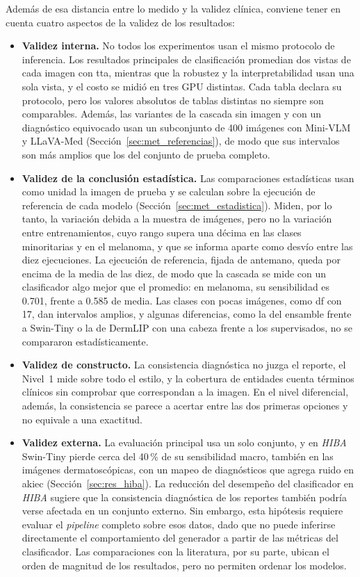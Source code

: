 Además de esa distancia entre lo medido y la validez clínica, conviene tener en cuenta cuatro aspectos de la validez de los resultados:
\begin{itemize}
    \item \textbf{Validez interna.} No todos los experimentos usan el mismo protocolo de inferencia. Los resultados
    principales de clasificación promedian dos vistas de cada imagen con \gls{tta}, mientras que la robustez y la
    interpretabilidad usan una sola vista, y el costo se midió en tres GPU distintas. Cada tabla declara su protocolo,
    pero los valores absolutos de tablas distintas no siempre son comparables. Además, las variantes de la cascada sin
    imagen y con un diagnóstico equivocado usan un subconjunto de 400 imágenes con Mini-VLM y LLaVA-Med
    (Sección~\ref{sec:met_referencias}), de modo que sus intervalos son más amplios que los del conjunto de prueba completo.
    \item \textbf{Validez de la conclusión estadística.} Las comparaciones estadísticas usan como unidad la imagen de prueba y se
    calculan sobre la ejecución de referencia de cada modelo (Sección~\ref{sec:met_estadistica}). Miden, por lo
    tanto, la variación debida a la muestra de imágenes, pero no la variación entre entrenamientos, cuyo rango supera una décima en las clases minoritarias y en el melanoma, y que se informa aparte como desvío entre las diez ejecuciones. La ejecución de referencia, fijada de antemano, queda por encima de la media de las diez, de modo que la cascada se mide con un clasificador algo mejor que el promedio: en melanoma, su sensibilidad es 0.701, frente a 0.585 de media. Las
    clases con pocas imágenes, como \gls{df} con 17, dan intervalos amplios, y algunas diferencias, como la del
    ensamble frente a Swin-Tiny o la de DermLIP con una cabeza frente a los supervisados, no se compararon estadísticamente.
    \item \textbf{Validez de constructo.} La consistencia diagnóstica no juzga el reporte, el Nivel~1 mide sobre todo
    el estilo, y la cobertura de entidades cuenta términos clínicos sin comprobar que correspondan a la imagen. En el
    nivel diferencial, además, la consistencia se parece a acertar entre las dos primeras opciones y no equivale a una
    exactitud.
    \item \textbf{Validez externa.} La evaluación principal usa un solo conjunto, y en \emph{HIBA} Swin-Tiny pierde
    cerca del 40\,\% de su sensibilidad macro, también en las imágenes dermatoscópicas, con un mapeo de diagnósticos
    que agrega ruido en \gls{akiec} (Sección~\ref{sec:res_hiba}). La reducción del desempeño del clasificador en \emph{HIBA} sugiere que la consistencia diagnóstica de los reportes también podría verse afectada en un conjunto externo. Sin embargo, esta hipótesis requiere evaluar el \emph{pipeline} completo sobre esos datos, dado que no puede inferirse directamente el comportamiento del generador a partir de las métricas del clasificador. Las
    comparaciones con la literatura, por su parte, ubican el orden de magnitud de los resultados, pero no permiten
    ordenar los modelos.
\end{itemize}

